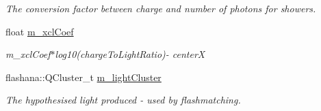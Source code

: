 \begin{DoxyCompactItemize}
\begin{DoxyCompactList}\small\item\em The conversion factor between charge and number of photons for showers. \end{DoxyCompactList}\item 
\hypertarget{classflashmatch_1_1FlashMatchingTool_1_1SliceCandidate_ad903070f4430d2cdba484d4aa4036a13}{float \hyperlink{classflashmatch_1_1FlashMatchingTool_1_1SliceCandidate_ad903070f4430d2cdba484d4aa4036a13}{m\-\_\-xcl\-Coef}}\label{classflashmatch_1_1FlashMatchingTool_1_1SliceCandidate_ad903070f4430d2cdba484d4aa4036a13}

\begin{DoxyCompactList}\small\item\em m\-\_\-xcl\-Coef$\ast$log10(charge\-To\-Light\-Ratio)-\/ center\-X \end{DoxyCompactList}\item 
\hypertarget{classflashmatch_1_1FlashMatchingTool_1_1SliceCandidate_a54f3af045d322b457a94b52b4e7799af}{flashana\-::\-Q\-Cluster\-\_\-t \hyperlink{classflashmatch_1_1FlashMatchingTool_1_1SliceCandidate_a54f3af045d322b457a94b52b4e7799af}{m\-\_\-light\-Cluster}}\label{classflashmatch_1_1FlashMatchingTool_1_1SliceCandidate_a54f3af045d322b457a94b52b4e7799af}

\begin{DoxyCompactList}\small\item\em The hypothesised light produced -\/ used by flashmatching. \end{DoxyCompactList}\end{DoxyCompactItemize}
